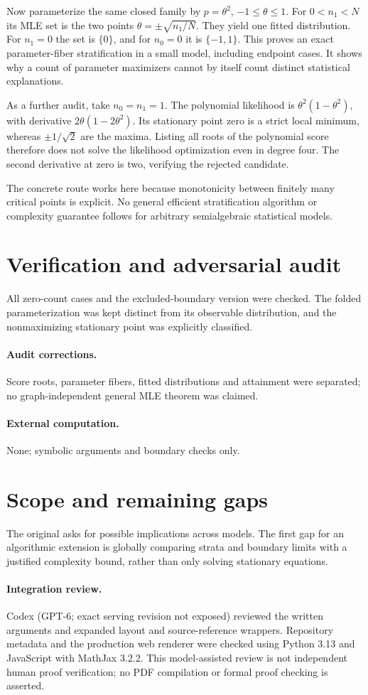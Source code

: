 \documentclass[11pt]{article}
\begin{document}
Now parameterize the same closed family by $p=\theta^2$, $-1\le\theta\le1$.
For $0<n_1<N$ its MLE set is the two points
$\theta=\pm\sqrt{n_1/N}$. They yield one fitted distribution. For $n_1=0$
the set is $\{0\}$, and for $n_0=0$ it is $\{-1,1\}$. This proves an exact
parameter-fiber stratification in a small model, including endpoint cases.
It shows why a count of parameter maximizers cannot by itself count distinct
statistical explanations.

As a further audit, take $n_0=n_1=1$. The polynomial likelihood is
$\theta^2(1-\theta^2)$, with derivative $2\theta(1-2\theta^2)$.
Its stationary point zero is a strict local minimum, whereas
$\pm1/\sqrt2$ are the maxima. Listing all roots of the polynomial score
therefore does not solve the likelihood optimization even in degree four.
The second derivative at zero is two, verifying the rejected candidate.

The concrete route works here because monotonicity between finitely many
critical points is explicit. No general efficient stratification algorithm or
complexity guarantee follows for arbitrary semialgebraic statistical models.
\section{Verification and adversarial audit}
All zero-count cases and the excluded-boundary version were checked.
The folded parameterization was kept distinct from its observable distribution,
and the nonmaximizing stationary point was explicitly classified.
\paragraph{Audit corrections.} Score roots, parameter fibers, fitted distributions and attainment were separated; no graph-independent general MLE theorem was claimed.
\paragraph{External computation.} None; symbolic arguments and boundary checks only.
\section{Scope and remaining gaps}
The original asks for possible implications across models. The first gap
for an algorithmic extension is globally comparing strata and boundary limits
with a justified complexity bound, rather than only solving stationary equations.
\paragraph{Integration review.} Codex (GPT-6; exact serving revision not exposed) reviewed the written arguments and expanded layout and source-reference wrappers. Repository metadata and the production web renderer were checked using Python 3.13 and JavaScript with MathJax 3.2.2. This model-assisted review is not independent human proof verification; no PDF compilation or formal proof checking is asserted.
\end{document}
